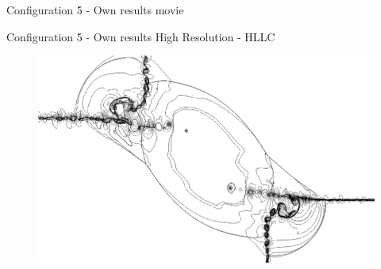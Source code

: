 \begin{frame}{Configuration 5 - Own results}
	movie
\end{frame}

\begin{frame}{Configuration 5 - Own results}
	High Resolution - HLLC
	
\begin{figure}
\centering
\includegraphics[width=0.7\linewidth]{../../figs/Configuration5_HighRes}
\label{fig:Configuration5_HighRes}
\end{figure}

\end{frame}
	